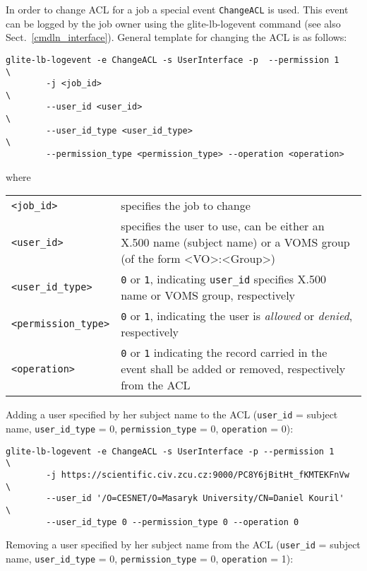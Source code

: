 In order to change ACL for a job a special event \verb+ChangeACL+ is used. This
event can be logged by the job owner using the glite-lb-logevent command (see also
Sect.~\ref{cmdln_interface}). General template for changing the ACL is as follows:
\begin{verbatim}
glite-lb-logevent -e ChangeACL -s UserInterface -p	--permission 1          \
        -j <job_id>                                                     \
        --user_id <user_id>                                             \
        --user_id_type <user_id_type>                                   \
        --permission_type <permission_type> --operation <operation>
\end{verbatim}

where

\begin{tabularx}{\textwidth}{lX}
\verb'<job_id>'    & specifies the job to change \\
\verb'<user_id>'   & specifies the user to use, can be either an X.500 name
                     (subject name) or a VOMS group (of the form <VO>:<Group>)\\
\verb'<user_id_type>'    & \verb'0' or \verb'1', indicating \verb'user_id'
                     specifies X.500 name or VOMS group, respectively \\
\verb'<permission_type>' & \verb'0' or \verb'1', indicating the user is 
                     \textit{allowed} or \textit{denied}, respectively \\
\verb'<operation>' & \verb'0' or \verb'1' indicating the record carried in
                     the event shall be added or removed, respectively from
		     the ACL \\
\end{tabularx}

Adding a user specified by her subject name to the ACL (\verb'user_id' =
subject name, \verb'user_id_type' = 0, \verb'permission_type' = 0,
\verb'operation' = 0):
\begin{verbatim}
glite-lb-logevent -e ChangeACL -s UserInterface -p --permission 1          \
        -j https://scientific.civ.zcu.cz:9000/PC8Y6jBitHt_fKMTEKFnVw    \
        --user_id '/O=CESNET/O=Masaryk University/CN=Daniel Kouril'     \
        --user_id_type 0 --permission_type 0 --operation 0
\end{verbatim}

Removing a user specified by her subject name from the ACL (\verb'user_id' =
subject name, \verb'user_id_type' = 0, \verb'permission_type' = 0,
\verb'operation' = 1):

